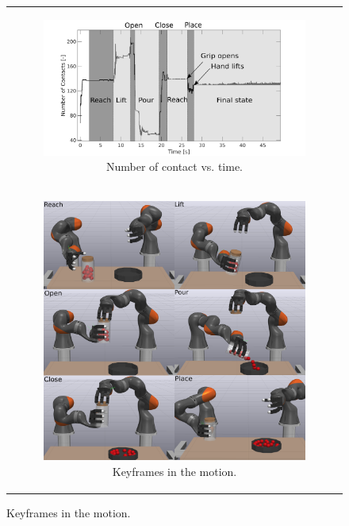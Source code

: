 \begin{figure}[!htb]
    \centering
    \begin{tabular}[t]{c}
        \begin{subfigure}{1.0\columnwidth}
            \centering \hspace{-0.07\columnwidth}
            \includegraphics[width=0.95\columnwidth]{figures/dual_arm/dual_arm_contact.png}
            \caption{Number of contact vs. time.}
        \end{subfigure}\\
        \begin{subfigure}{1.0\columnwidth}
            \includegraphics[width=0.95\columnwidth]{figures/dual_arm/tiled.png}
            \caption{Keyframes in the motion.}
        \end{subfigure}
    \end{tabular}
\end{figure}
